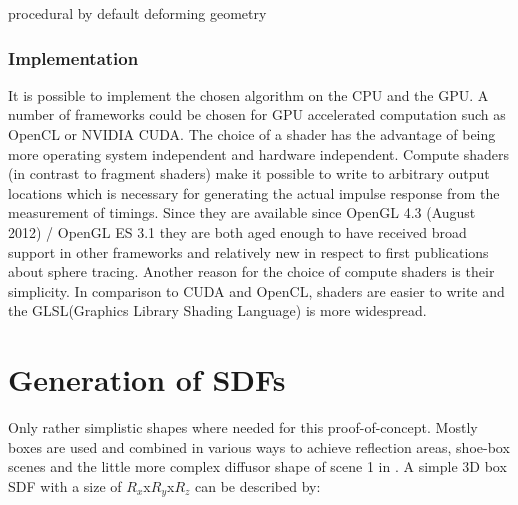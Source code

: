 \documentclass[twoside,a4paper]{article}
\begin{document}





procedural by default
deforming geometry
\subsubsection{Implementation}
It is possible to implement the chosen algorithm on the CPU and the GPU. A number of frameworks could be chosen for GPU accelerated computation such as OpenCL or NVIDIA CUDA. The choice of a shader has the advantage of being more operating system independent and hardware independent. Compute shaders (in contrast to fragment shaders) make it possible to write to arbitrary output locations which is necessary for generating the actual impulse response from the measurement of timings. Since they are available since OpenGL 4.3 (August 2012) / OpenGL ES 3.1 they are both aged enough to have received broad support in other frameworks and relatively new in respect to first publications about sphere tracing. Another reason for the choice of compute shaders is their simplicity. In comparison to CUDA and OpenCL, shaders are easier to write and the GLSL(Graphics Library Shading Language) is more widespread. 


\section{Generation of SDFs}

Only rather simplistic shapes where needed for this proof-of-concept. Mostly boxes are used and combined in various ways to achieve reflection areas, shoe-box scenes and the little more complex diffusor shape of scene 1 in \cite{brinkmann_round_2019}. A simple 3D box SDF with a size of $R_x$x$R_y$x$R_z$ can be described by:
\end{document}
